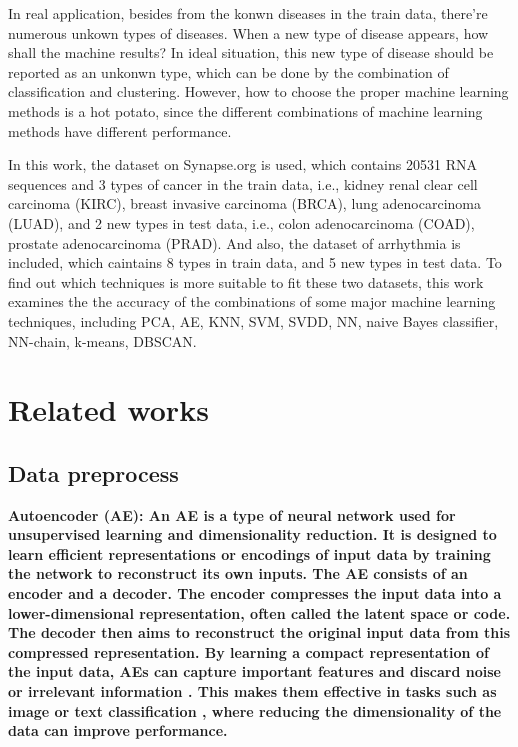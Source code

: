 \documentclass[twocolumn,10pt]{article}
\begin{document}
In real application, besides from the konwn diseases in the train data, there're numerous unkown types of diseases. 
When a new type of disease appears, how shall the machine results? In ideal situation, this new type of disease should be 
reported as an unkonwn type, which can be done by the combination of classification and clustering. 
However, how to choose the proper machine learning methods is a hot potato, since the different combinations 
of machine learning methods have different performance. 

In this work, the dataset on Synapse.org is used, which contains 20531 RNA sequences and 3 types of cancer 
in the train data, i.e., kidney renal clear cell carcinoma (KIRC), breast invasive carcinoma (BRCA), 
lung adenocarcinoma (LUAD), and 2 new types in test data, i.e., colon adenocarcinoma (COAD), 
prostate adenocarcinoma (PRAD). And also, the dataset of arrhythmia is included, which caintains
8 types in train data, and 5 new types in test data. To find out which techniques is more suitable to fit 
these two datasets, this work examines the the accuracy of the combinations of some major machine 
learning techniques, including PCA, AE, KNN, SVM, SVDD, NN, naive Bayes classifier, NN-chain, k-means, 
DBSCAN. 

\section{Related works}
\label{sec:Related works}

\subsection*{Data preprocess}

\bf{Autoencoder (AE)}: \rm{An} AE is a type of neural network used for unsupervised 
learning and dimensionality reduction. It is designed to learn efficient representations or encodings of 
input data by training the network to reconstruct its own inputs. The AE consists of an encoder 
and a decoder. The encoder compresses the input data into a lower-dimensional representation, often called 
the latent space or code. The decoder then aims to reconstruct the original input data from this compressed 
representation. By learning a compact representation of the input data, AEs can capture important features 
and discard noise or irrelevant information \cite{lu2013speech}. This makes them effective in tasks such as 
image \cite{zhang2018better} \cite{lore2017llnet} \cite{cheng2018deep} or text classification \cite{xu2017variational} 
\cite{xu2019semisupervised}, where reducing the dimensionality of the data can improve performance.
\end{document}

